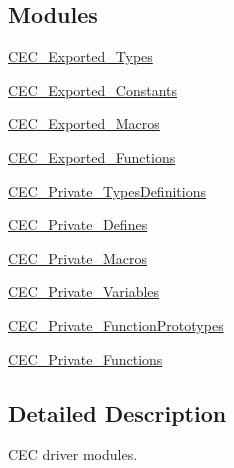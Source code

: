 \subsection*{Modules}
\begin{DoxyCompactItemize}
\item 
\hyperlink{group___c_e_c___exported___types}{C\+E\+C\+\_\+\+Exported\+\_\+\+Types}
\item 
\hyperlink{group___c_e_c___exported___constants}{C\+E\+C\+\_\+\+Exported\+\_\+\+Constants}
\item 
\hyperlink{group___c_e_c___exported___macros}{C\+E\+C\+\_\+\+Exported\+\_\+\+Macros}
\item 
\hyperlink{group___c_e_c___exported___functions}{C\+E\+C\+\_\+\+Exported\+\_\+\+Functions}
\item 
\hyperlink{group___c_e_c___private___types_definitions}{C\+E\+C\+\_\+\+Private\+\_\+\+Types\+Definitions}
\item 
\hyperlink{group___c_e_c___private___defines}{C\+E\+C\+\_\+\+Private\+\_\+\+Defines}
\item 
\hyperlink{group___c_e_c___private___macros}{C\+E\+C\+\_\+\+Private\+\_\+\+Macros}
\item 
\hyperlink{group___c_e_c___private___variables}{C\+E\+C\+\_\+\+Private\+\_\+\+Variables}
\item 
\hyperlink{group___c_e_c___private___function_prototypes}{C\+E\+C\+\_\+\+Private\+\_\+\+Function\+Prototypes}
\item 
\hyperlink{group___c_e_c___private___functions}{C\+E\+C\+\_\+\+Private\+\_\+\+Functions}
\end{DoxyCompactItemize}


\subsection{Detailed Description}
C\+EC driver modules. 

